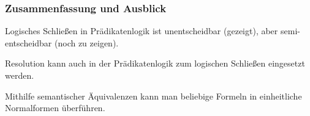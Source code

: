 \documentclass[aspectratio=1610,onlymath]{beamer}
\begin{document}
% 
% 
% 
% 

% 
% 






\begin{frame}\frametitle{Zusammenfassung und Ausblick}

Logisches Schließen in Prädikatenlogik ist unentscheidbar
(gezeigt), 
aber semi-entscheidbar 
(noch zu zeigen).\bigskip

Resolution kann auch in der Prädikatenlogik zum logischen Schließen eingesetzt werden.
\bigskip

Mithilfe semantischer Äquivalenzen kann man beliebige Formeln in einheitliche Normalformen überführen.\bigskip


\end{frame}
\end{document}
